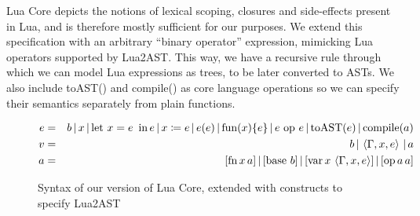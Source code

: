 \documentclass[english]{llncs}
\begin{document}
Lua Core depicts the notions of lexical scoping, closures and side-effects
present in Lua, and is therefore mostly sufficient for our purposes.
We extend this specification with an arbitrary ``binary operator''
expression, mimicking Lua operators supported by Lua2AST. This way,
we have a recursive rule through which we can model Lua expressions
as trees, to be later converted to ASTs. We also include toAST() and
compile() as core language operations so we can specify their semantics
separately from plain functions.

\begin{figure}[t]
\begin{eqnarray*}
e & = & b\,|\, x\,|\,\mbox{let \ensuremath{x=e}\,\ in\,\ensuremath{e}}\,|\, x\coloneqq e\,|\, e(e)\,|\,\mbox{fun}(x)\{e\}\,|\, e\mbox{ op }e\,|\,\mbox{toAST}(e)\,|\,\mbox{compile}(a)\\
v & = & b\,|\,\left\langle \Gamma,x,e\right\rangle \,|\, a\\
a & = & [\mbox{fn\,\ensuremath{x}\,\ensuremath{a}}]\,|\,[\mbox{base \ensuremath{b}}]\,|\,[\mbox{var}\, x\,\left\langle \Gamma,x,e\right\rangle ]\,|\,[\mbox{op\,\ensuremath{a}\,\ensuremath{a}}]
\end{eqnarray*}
\protect\caption{\label{fig:LuaCoreSyntax}Syntax of our version of Lua Core, extended
with constructs to specify Lua2AST}
\end{figure}
\end{document}
